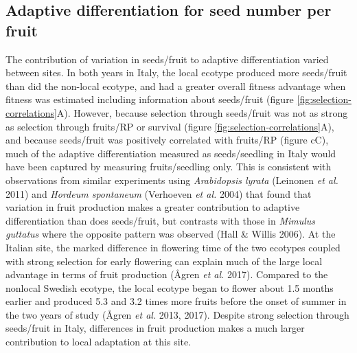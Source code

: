 \documentclass[]{article}
\begin{document}
\hypertarget{adaptive-differentiation-for-seed-number-per-fruit}{%
\subsection{Adaptive differentiation for seed number per fruit}\label{adaptive-differentiation-for-seed-number-per-fruit}}

The contribution of variation in seeds/fruit to adaptive differentiation varied between sites. In both years in Italy, the local ecotype produced more seeds/fruit than did the non-local ecotype, and had a greater overall fitness advantage when fitness was estimated including information about seeds/fruit (figure \ref{fig:selection-correlations}A). However, because selection through seeds/fruit was not as strong as selection through fruits/RP or survival (figure \ref{fig:selection-correlations}A), and because seeds/fruit was positively correlated with fruits/RP (figure cC), much of the adaptive differentiation measured as seeds/seedling in Italy would have been captured by measuring fruits/seedling only. This is consistent with observations from similar experiments using \emph{Arabidopsis lyrata} (Leinonen \emph{et al.} 2011) and \emph{Hordeum spontaneum} (Verhoeven \emph{et al.} 2004) that found that variation in fruit production makes a greater contribution to adaptive differentiation than does seeds/fruit, but contrasts with those in \emph{Mimulus guttatus} where the opposite pattern was observed (Hall \& Willis 2006). At the Italian site, the marked difference in flowering time of the two ecotypes coupled with strong selection for early flowering can explain much of the large local advantage in terms of fruit production (Ågren \emph{et al.} 2017). Compared to the nonlocal Swedish ecotype, the local ecotype began to flower about 1.5 months earlier and produced 5.3 and 3.2 times more fruits before the onset of summer in the two years of study (Ågren \emph{et al.} 2013, 2017). Despite strong selection through seeds/fruit in Italy, differences in fruit production makes a much larger contribution to local adaptation at this site.
\end{document}
